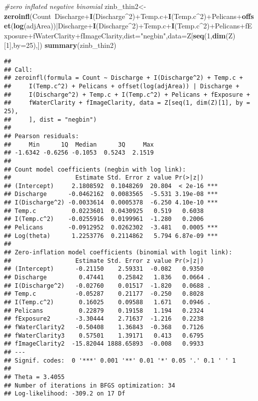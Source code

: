 \documentclass[]{article}
\newenvironment{Shaded}{\begin{snugshade}}{\end{snugshade}}
\newcommand{\KeywordTok}[1]{\textcolor[rgb]{0.13,0.29,0.53}{\textbf{{#1}}}}
\newcommand{\DataTypeTok}[1]{\textcolor[rgb]{0.13,0.29,0.53}{{#1}}}
\newcommand{\DecValTok}[1]{\textcolor[rgb]{0.00,0.00,0.81}{{#1}}}
\newcommand{\StringTok}[1]{\textcolor[rgb]{0.31,0.60,0.02}{{#1}}}
\newcommand{\CommentTok}[1]{\textcolor[rgb]{0.56,0.35,0.01}{\textit{{#1}}}}
\newcommand{\NormalTok}[1]{{#1}}
\begin{document}
\begin{Shaded}
\begin{Highlighting}[]
\CommentTok{#zero inflated negative binomial}
\NormalTok{zinb_thin2<-}\KeywordTok{zeroinfl}\NormalTok{(Count~Discharge+}\KeywordTok{I}\NormalTok{(Discharge^}\DecValTok{2}\NormalTok{)+Temp.c+}\KeywordTok{I}\NormalTok{(Temp.c^}\DecValTok{2}\NormalTok{)+Pelicans+}\KeywordTok{offset}\NormalTok{(}\KeywordTok{log}\NormalTok{(adjArea))|Discharge+}\KeywordTok{I}\NormalTok{(Discharge^}\DecValTok{2}\NormalTok{)+Temp.c+}\KeywordTok{I}\NormalTok{(Temp.c^}\DecValTok{2}\NormalTok{)+Pelicans+fExposure+fWaterClarity+fImageClarity,}\DataTypeTok{dist=}\StringTok{"negbin"}\NormalTok{,}\DataTypeTok{data=}\NormalTok{Z[}\KeywordTok{seq}\NormalTok{(}\DecValTok{1}\NormalTok{,}\KeywordTok{dim}\NormalTok{(Z)[}\DecValTok{1}\NormalTok{],}\DataTypeTok{by=}\DecValTok{25}\NormalTok{),])}
\KeywordTok{summary}\NormalTok{(zinb_thin2)}
\end{Highlighting}
\end{Shaded}

\begin{verbatim}
## 
## Call:
## zeroinfl(formula = Count ~ Discharge + I(Discharge^2) + Temp.c + 
##     I(Temp.c^2) + Pelicans + offset(log(adjArea)) | Discharge + 
##     I(Discharge^2) + Temp.c + I(Temp.c^2) + Pelicans + fExposure + 
##     fWaterClarity + fImageClarity, data = Z[seq(1, dim(Z)[1], by = 25), 
##     ], dist = "negbin")
## 
## Pearson residuals:
##     Min      1Q  Median      3Q     Max 
## -1.6342 -0.6256 -0.1053  0.5243  2.1519 
## 
## Count model coefficients (negbin with log link):
##                  Estimate Std. Error z value Pr(>|z|)    
## (Intercept)     2.1808592  0.1048269  20.804  < 2e-16 ***
## Discharge      -0.0462162  0.0083565  -5.531 3.19e-08 ***
## I(Discharge^2) -0.0033614  0.0005378  -6.250 4.10e-10 ***
## Temp.c          0.0223601  0.0430925   0.519   0.6038    
## I(Temp.c^2)    -0.0255916  0.0199961  -1.280   0.2006    
## Pelicans       -0.0912952  0.0262302  -3.481   0.0005 ***
## Log(theta)      1.2253776  0.2114862   5.794 6.87e-09 ***
## 
## Zero-inflation model coefficients (binomial with logit link):
##                  Estimate Std. Error z value Pr(>|z|)  
## (Intercept)      -0.21150    2.59331  -0.082   0.9350  
## Discharge         0.47441    0.25842   1.836   0.0664 .
## I(Discharge^2)   -0.02760    0.01517  -1.820   0.0688 .
## Temp.c           -0.05287    0.21177  -0.250   0.8028  
## I(Temp.c^2)       0.16025    0.09588   1.671   0.0946 .
## Pelicans          0.22879    0.19158   1.194   0.2324  
## fExposure2       -3.30444    2.71637  -1.216   0.2238  
## fWaterClarity2   -0.50408    1.36843  -0.368   0.7126  
## fWaterClarity3    0.57501    1.39171   0.413   0.6795  
## fImageClarity2  -15.82044 1888.65893  -0.008   0.9933  
## ---
## Signif. codes:  0 '***' 0.001 '**' 0.01 '*' 0.05 '.' 0.1 ' ' 1 
## 
## Theta = 3.4055 
## Number of iterations in BFGS optimization: 34 
## Log-likelihood: -309.2 on 17 Df
\end{verbatim}
\end{document}
